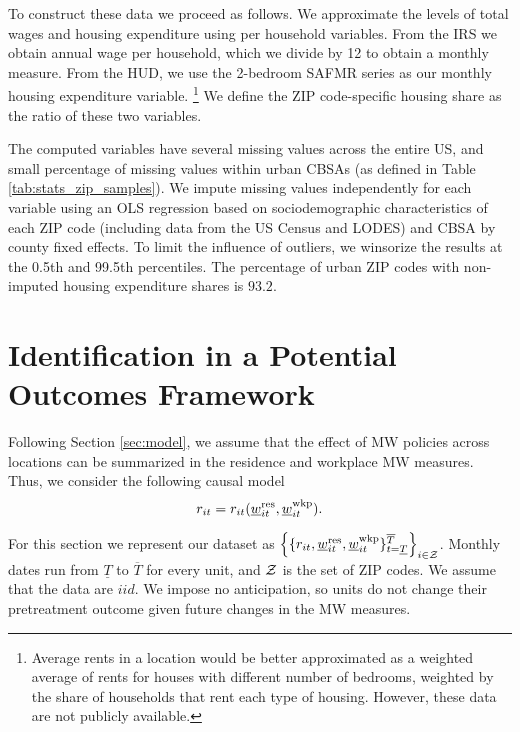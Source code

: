 To construct these data we proceed as follows.
We approximate the levels of total wages and housing expenditure using per 
household variables.
From the IRS we obtain annual wage per household, which we 
divide by 12 to obtain a monthly measure.
From the HUD, we use the 2-bedroom SAFMR series as our monthly housing 
expenditure variable.%
\footnote{Average rents in a location would be better approximated as a
weighted average of rents for houses with different number of bedrooms,
weighted by the share of households that rent each type of housing.
However, these data are not publicly available.}
We define the ZIP code-specific housing share as the ratio of these two 
variables.

The computed variables have several missing values across the entire US, and 
small percentage of missing values within urban CBSAs 
(as defined in Table \ref{tab:stats_zip_samples}).
We impute missing values independently for each variable using an OLS
regression based on sociodemographic characteristics of each ZIP code 
(including data from the US Census and LODES) and CBSA by county fixed effects.
To limit the influence of outliers, we winsorize the results at the 0.5th and 
99.5th percentiles. 
The percentage of urban ZIP codes with non-imputed housing expenditure shares 
is $93.2$.
%
%

\clearpage
\section{Identification in a Potential Outcomes Framework}
\label{sec:potential_outcomes}

Following Section \ref{sec:model}, we assume that the effect of MW policies 
across locations can be summarized in the residence and workplace MW measures.
Thus, we consider the following causal model
\begin{equation}\label{eq:causal_model}
    r_{it} = r_{it}(\underline{w}_{it}^{\text{res}}, \underline{w}_{it}^{\text{wkp}}) .
\end{equation}

For this section we represent our dataset as
$\left\{\{r_{it}, \underline{w}^{\text{res}}_{it}, \underline{w}^{\text{wkp}}_{it}\}
       _{t=\underline{T}}^{\overline{T}}\right\}_{i\in\mathcal{Z}}$.
Monthly dates run from $\underline{T}$ to $\overline{T}$ for every unit,
and $\mathcal{Z}$ is the set of ZIP codes.
We assume that the data are $iid$.
We impose no anticipation, so units do not change their pretreatment outcome 
given future changes in the MW measures.


